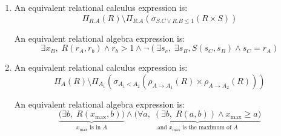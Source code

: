 \documentclass{../../cs-classes/cs-classes}
\begin{document}
\setcounter{exercise}{6}
\begin{exercise}
    \begin{enumerate}
        \item An equivalent relational calculus expression is:
        \begin{equation*}
            \Pi_{R.A}(R)\setminus\Pi_{R.A}(\sigma_{S.C\lor R.B\leq 1}(R\times S))
        \end{equation*}

        An equivalent relational algebra expression is:
        \begin{equation*}
            \exists x_B, \; R(r_A, r_b) \land r_b > 1 \land \lnot (\exists s_c, \; \exists s_B, S(s_C, s_B)\land s_C=r_A)
        \end{equation*}

        \item An equivalent relational calculus expression is:
        \begin{equation*}
            \Pi_A(R)\setminus \Pi_{A_1}(\sigma_{A_1<A_2}(\rho_{A\to A_1}(R)\times \rho_{A\to A_2}(R)))
        \end{equation*}

        An equivalent relational algebra expression is:
        \begin{equation*}
            \underbrace{\big(\exists b, \; R(x_{\max}, b)\big)}_{x_{\max} \text{ is in } A} \land \underbrace{\big(\forall a, \; (\exists b, \; R(a, b)) \land x_{\max} \geq a\big)}_{\text{and } x_{\max} \text{ is the maximum of } A}
        \end{equation*}
    \end{enumerate}
\end{exercise}
\end{document}
